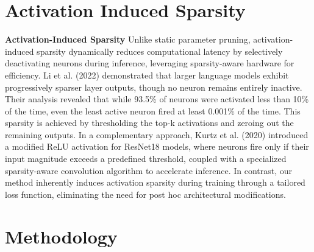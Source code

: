 \documentclass[11pt,a4paper]{article}
\begin{document}
\section{Activation Induced Sparsity}

\textbf{Activation-Induced Sparsity} Unlike static parameter pruning, activation-induced sparsity dynamically reduces computational latency by selectively deactivating neurons during inference, leveraging sparsity-aware hardware for efficiency. Li et al. (2022) demonstrated that larger language models exhibit progressively sparser layer outputs, though no neuron remains entirely inactive. Their analysis revealed that while 93.5\% of neurons were activated less than 10\% of the time, even the least active neuron fired at least 0.001\% of the time. This sparsity is achieved by thresholding the top-k activations and zeroing out the remaining outputs. In a complementary approach, Kurtz et al. (2020) introduced a modified ReLU activation for ResNet18 models, where neurons fire only if their input magnitude exceeds a predefined threshold, coupled with a specialized sparsity-aware convolution algorithm to accelerate inference. In contrast, our method inherently induces activation sparsity during training through a tailored loss function, eliminating the need for post hoc architectural modifications.




\section{Methodology}
\end{document}
